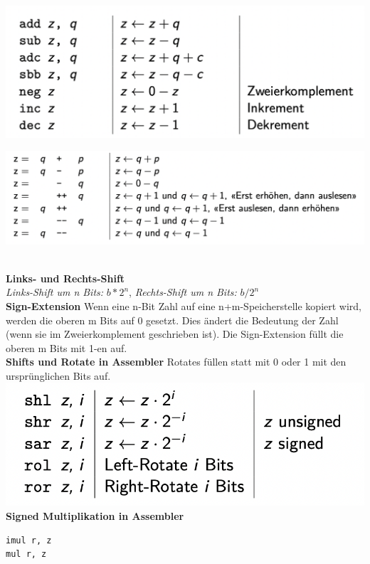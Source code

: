 \documentclass[7pt,landscape,a4paper]{scrartcl}
\begin{document}
\begin{multicols*}{4}
\begin{minipage}[b]{0,4\linewidth}
\includegraphics[width=\linewidth]{armassembler}
\end{minipage}
\begin{minipage}[b]{0,6\linewidth}
\includegraphics[width=\linewidth]{armc}
\end{minipage}\\
\textbf{Links- und Rechts-Shift}\\
\textit{Links-Shift um n Bits:} $b * 2^{n}$,
\textit{Rechts-Shift um n Bits:} $b / 2^{n}$\\
\textbf{Sign-Extension}
Wenn eine n-Bit Zahl auf eine n+m-Speicherstelle kopiert wird, werden die oberen m Bits auf 0 gesetzt. Dies ändert  die Bedeutung der Zahl (wenn sie im Zweierkomplement geschrieben ist).
Die Sign-Extension füllt die oberen m Bits mit 1-en auf.\\
\textbf{Shifts und Rotate in Assembler}
Rotates füllen statt mit 0 oder 1 mit den ursprünglichen Bits auf.\\
\includegraphics[width=0.5\linewidth]{shrt}\\
\textbf{Signed Multiplikation in Assembler}\\
\begin{minipage}[b]{0,2\linewidth}
\begin{verbatim}
imul r, z 
mul r, z 
\end{verbatim}
\end{minipage}

\end{multicols*}
\end{document}
